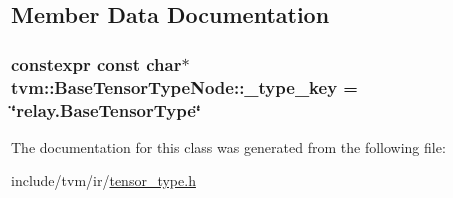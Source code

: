 \subsection{Member Data Documentation}
\subsubsection[{\texorpdfstring{\+\_\+type\+\_\+key}{_type_key}}]{\setlength{\rightskip}{0pt plus 5cm}constexpr const char$\ast$ tvm\+::\+Base\+Tensor\+Type\+Node\+::\+\_\+type\+\_\+key = \char`\"{}relay.\+Base\+Tensor\+Type\char`\"{}\hspace{0.3cm}{\ttfamily [static]}}\hypertarget{classtvm_1_1BaseTensorTypeNode_a206bc6500bcacd821703cf8a5db2541b}{}\label{classtvm_1_1BaseTensorTypeNode_a206bc6500bcacd821703cf8a5db2541b}


The documentation for this class was generated from the following file\+:\begin{DoxyCompactItemize}
\item 
include/tvm/ir/\hyperlink{tensor__type_8h}{tensor\+\_\+type.\+h}\end{DoxyCompactItemize}
